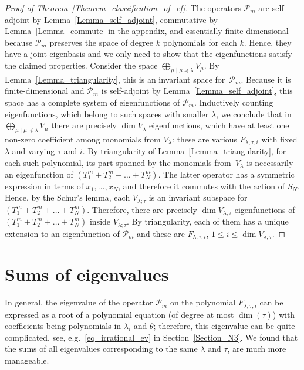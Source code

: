 \documentclass[11pt]{article}
\theoremstyle{definition}
\numberwithin{equation}{section}
\newcommand{\PP}{\mathcal P}
\begin{document}
\begin{proof}[Proof of Theorem~\ref{Theorem_classification_of_ef}] The operators $\PP_m$ are self-adjoint by Lemma~\ref{Lemma_self_adjoint}, commutative by Lemma~\ref{Lemma_commute} in the appendix, and essentially finite-dimensional because $\PP_m$ preserves the space of degree $k$ polynomials for each $k$. Hence, they have a joint eigenbasis and we only need to show that the eigenfunctions satisfy the claimed properties.  Consider the space $\bigoplus\limits_{\mu\mid \mu\preceq \lambda} V_{\mu}$. By Lemma~\ref{Lemma_triangularity}, this is an invariant space for~$\PP_m$. Because it is finite-dimensional and $\PP_m$ is self-adjoint by Lemma~\ref{Lemma_self_adjoint}, this space has a complete system of eigenfunctions of $\PP_m$. Inductively counting eigenfunctions, which belong to such spaces with smaller $\lambda$, we conclude that in $\bigoplus\limits_{\mu\mid \mu\preceq \lambda} V_{\mu}$ there are precisely $\dim V_\lambda$ eigenfunctions, which have at least one non-zero coefficient among monomials from $V_\lambda$: these are various $F_{\lambda,\tau,i}$ with fixed $\lambda$ and varying $\tau$ and $i$. By triangularity of Lemma~\ref{Lemma_triangularity}, for each such polynomial, its part spanned by the monomials from~$V_\lambda$ is necessarily an eigenfunction of $(T_1^m+T_2^m+\dots+T_N^m)$. The latter operator has a symmetric expression in terms of $x_1,\dots,x_N$, and therefore it commutes with the action of $S_N$. Hence, by the Schur's lemma, each $V_{\lambda;\tau}$ is an invariant subspace for $(T_1^m+T_2^m+\dots+T_N^m)$. Therefore, there are precisely $\dim V_{\lambda;\tau}$ eigenfunctions of $(T_1^m+T_2^m+\dots+T_N^m)$ inside $V_{\lambda;\tau}$. By triangularity, each of them has a unique extension to an eigenfunction of $\PP_m$ and these are $F_{\lambda,\tau,i}$, $1\le i \le \dim V_{\lambda;\tau}$.
\end{proof}

\section{Sums of eigenvalues}

\label{Section_sums}

In general, the eigenvalue of the operator $\PP_m$ on the polynomial $F_{\lambda,\tau,i}$ can be expressed as a root of a polynomial equation (of degree at most $\dim(\tau)$) with coefficients being polynomials in $\lambda_i$ and $\theta$; therefore, this eigenvalue can be quite complicated, see, e.g.~\eqref{eq_irrational_ev} in Section~\ref{Section_N3}. We found that the sums of all eigenvalues corresponding to the same $\lambda$ and $\tau$, are much more manageable.
\end{document}
